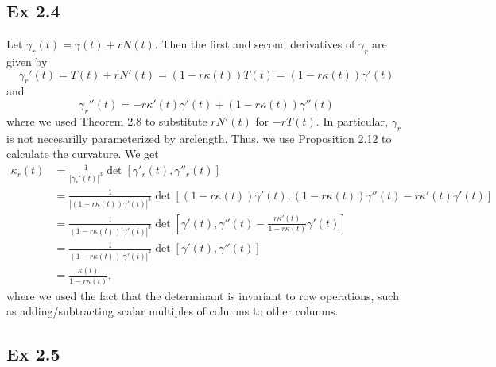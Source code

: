 \documentclass{article}
\theoremstyle{definition}
\begin{document}
\subsection*{Ex 2.4}

Let $\gamma_{r}(t) = \gamma(t) + r N(t)$. Then 
the first and second derivatives of $\gamma_r$ are given by
\[
	\gamma_r'(t) = T(t) + r N'(t) = (1 - r \kappa(t)) T(t) = (1 - r \kappa(t)) \gamma'(t)
\] 
and
\[
	\gamma_r''(t)
	=
	-r \kappa'(t)\gamma'(t) + (1 - r \kappa(t)) \gamma''(t)
\] 
where we used Theorem 2.8 to substitute $rN'(t)$ for $-rT(t)$. In particular,
$\gamma_r$ is not necesarilly parameterized by arclength. Thus, we use
Proposition 2.12 to calculate the curvature. We get
\begin{align*}
	\kappa_r(t)
	&=
	\frac{1}{|\gamma_r'(t)|^3}
	\det[\gamma'_r(t), \gamma''_r(t)] \\
	&=
	\frac{1}{|(1 - r \kappa(t)) \gamma'(t)|^3}
	\det[(1 - r \kappa(t))\gamma'(t), (1 - r \kappa(t))\gamma''(t) - r\kappa'(t)\gamma'(t)] \\
	&=
	\frac{1}{(1 - r \kappa(t)) |\gamma'(t)|^3}
	\det\left[\gamma'(t), \gamma''(t) - \frac{r \kappa'(t)}{1 - r\kappa(t)}\gamma'(t)\right] \\
	&=
	\frac{1}{(1 - r \kappa(t)) |\gamma'(t)|^3}
	\det\left[\gamma'(t), \gamma''(t)\right] \\
	&=
	\frac{\kappa(t)}{1 - r \kappa(t)},
\end{align*}
where we used the fact that the determinant is invariant to row operations, such as adding/subtracting 
scalar multiples of columns to other columns.

\subsection*{Ex 2.5}
\end{document}

